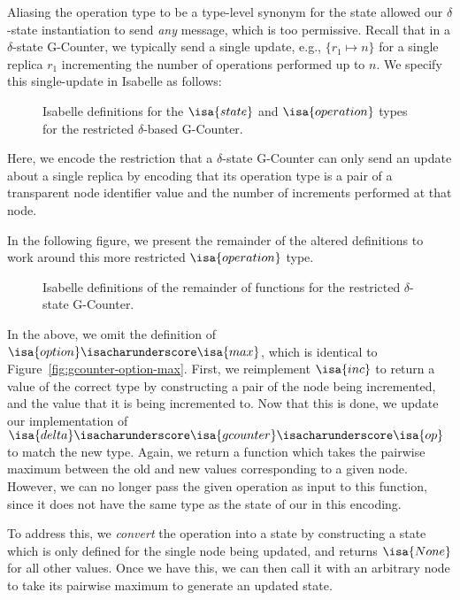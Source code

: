 Aliasing the operation type to be a type-level synonym for the state allowed our
$\delta$-state \CRDT instantiation to send \emph{any} message, which is too
permissive. Recall that in a $\delta$-state G-Counter, we typically send a
single update, e.g., $\{ r_1 \mapsto n \}$ for a single replica $r_1$
incrementing the number of operations performed up to $n$. We specify this
single-update in Isabelle as follows:

\begin{figure}[H]
  
  \caption{Isabelle definitions for the $\isa{state}$ and $\isa{operation}$
    types for the restricted $\delta$-based G-Counter.}
\end{figure}

Here, we encode the restriction that a $\delta$-state G-Counter can only send an
update about a single replica by encoding that its operation type is a pair of
a transparent node identifier value and the number of increments performed at
that node.

In the following figure, we present the remainder of the altered definitions to
work around this more restricted $\isa{operation}$ type.

\begin{figure}[H]
  
  \caption{Isabelle definitions of the remainder of functions for the restricted
    $\delta$-state G-Counter.}
\end{figure}

In the above, we omit the definition of
$\isa{option}\isacharunderscore\isa{max}$, which is identical to
Figure~\ref{fig:gcounter-option-max}. First, we reimplement $\isa{inc}$ to
return a value of the correct type by constructing a pair of the node being
incremented, and the value that it is being incremented to. Now that this is
done, we update our implementation of
$\isa{delta}\isacharunderscore\isa{gcounter}\isacharunderscore\isa{op}$ to match
the new type. Again, we return a function which takes the pairwise maximum
between the old and new values corresponding to a given node. However, we can no
longer pass the given operation as input to this function, since it does not
have the same type as the state of our \CRDT in this encoding.

To address this, we \emph{convert} the operation into a state by constructing a
state which is only defined for the single node being updated, and returns
$\isa{None}$ for all other values. Once we have this, we can then call it with
an arbitrary node to take its pairwise maximum to generate an updated state.

